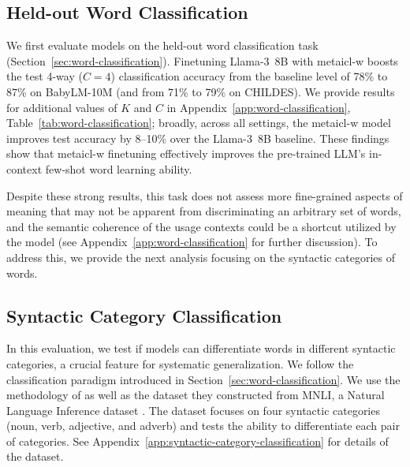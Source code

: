 \documentclass{article}
\begin{document}
\subsection{Held-out Word Classification}
\label{sec:word-classification-finetuned}
We first evaluate models on the held-out word classification task (Section~\ref{sec:word-classification}).
Finetuning \mbox{Llama-3 8B} with \ac{metaicl-w} boosts the test 4-way ($C=4$) classification accuracy from the baseline level of 78\% to 87\% on BabyLM-10M (and from 71\% to 79\% on CHILDES).
We provide results for additional values of $K$ and $C$ in Appendix~\ref{app:word-classification}, Table~\ref{tab:word-classification}; broadly, across all settings, the \ac{metaicl-w} model improves test accuracy by 8--10\% over the \mbox{Llama-3 8B} baseline.
These findings show that \ac{metaicl-w} finetuning effectively improves the pre-trained LLM's in-context few-shot word learning ability.

Despite these strong results, this task does not assess more fine-grained aspects of meaning that may not be apparent from discriminating an arbitrary set of words, and the semantic coherence of the usage contexts could be a shortcut utilized by the model (see Appendix~\ref{app:word-classification} for further discussion).
To address this, we provide the next analysis focusing on the syntactic categories of words.

\subsection{Syntactic Category Classification}
\label{sec:syntactic-category-classification}
In this evaluation, we test if models can differentiate words in different syntactic categories, a crucial feature for systematic generalization.
We follow the classification paradigm introduced in Section~\ref{sec:word-classification}.
We use the methodology of \citet{kim-smolensky-2021-testing} as well as the dataset they constructed from MNLI, a Natural Language Inference dataset \citep{MNLI}. The dataset focuses on four syntactic categories (noun, verb, adjective, and adverb) and tests the ability to differentiate each pair of categories. See Appendix~\ref{app:syntactic-category-classification} for details of the dataset.
\end{document}

